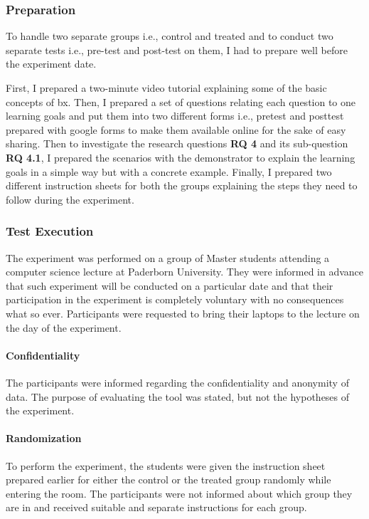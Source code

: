 \subsubsection{Preparation }\label{subsubsec:prep}
To handle two separate groups i.e., control and treated and to conduct two separate tests i.e., pre-test and post-test on them, I had to prepare well before the experiment date. 

First, I prepared a two-minute video tutorial explaining some of the basic concepts of bx. Then, I prepared a set of questions  relating each question to one learning goals and put them into two different forms  i.e., pretest and posttest prepared with google forms to make them available online for the sake of easy sharing. Then to investigate the research questions \textbf{RQ 4} and its sub-question \textbf{RQ 4.1}, I prepared the scenarios with the demonstrator to explain the learning goals in a simple way but with a concrete example. Finally, I prepared two different instruction sheets for both the groups explaining the steps they need to follow during the experiment.

\subsubsection{Test Execution}\label{subsubsec:execution}
The experiment was performed on a group of Master students attending a computer science lecture at Paderborn University. They were informed in advance that such experiment will be conducted on a particular date and that their participation in the experiment is completely voluntary with no consequences what so ever. Participants were requested to bring their laptops to the lecture on the day of the experiment.

\paragraph{Confidentiality} The participants were informed regarding the confidentiality and anonymity of data. The purpose of evaluating the tool was stated, but not the hypotheses of the experiment.

\paragraph{Randomization} To perform the experiment, the students were given the instruction sheet prepared earlier for either the control or the treated group randomly while entering the room. The participants were not informed about which group they are in and received suitable and separate instructions for each group.

